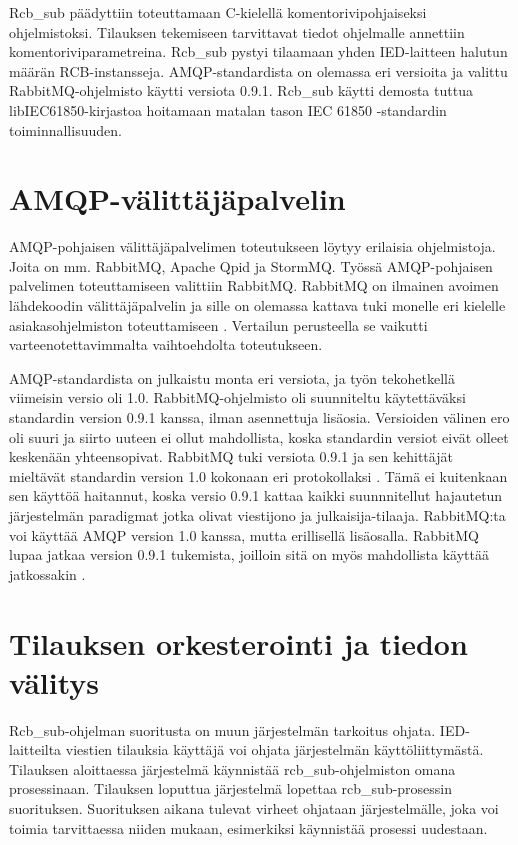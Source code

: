 Rcb\_sub päädyttiin toteuttamaan C-kielellä komentorivipohjaiseksi ohjelmistoksi. Tilauksen tekemiseen tarvittavat tiedot ohjelmalle annettiin komentoriviparametreina. Rcb\_sub pystyi tilaamaan yhden IED-laitteen halutun määrän RCB-instansseja. AMQP-standardista on olemassa eri versioita ja valittu RabbitMQ-ohjelmisto käytti versiota 0.9.1. Rcb\_sub käytti demosta tuttua libIEC61850-kirjastoa hoitamaan matalan tason IEC 61850 -standardin toiminnallisuuden.


\section{AMQP-välittäjäpalvelin}
AMQP-pohjaisen välittäjäpalvelimen toteutukseen löytyy erilaisia ohjelmistoja. Joita on mm. RabbitMQ, Apache Qpid ja StormMQ. Työssä AMQP-pohjaisen palvelimen toteuttamiseen valittiin RabbitMQ. RabbitMQ on ilmainen avoimen lähdekoodin välittäjäpalvelin ja sille on olemassa kattava tuki monelle eri kielelle asiakasohjelmiston toteuttamiseen \cite{rabbitmq-supported-languages}. Vertailun perusteella se vaikutti varteenotettavimmalta vaihtoehdolta toteutukseen.

AMQP-standardista on julkaistu monta eri versiota, ja työn tekohetkellä viimeisin versio oli 1.0. RabbitMQ-ohjelmisto oli suunniteltu käytettäväksi standardin version 0.9.1 kanssa, ilman asennettuja lisäosia. Versioiden välinen ero oli suuri ja siirto uuteen ei ollut mahdollista, koska standardin versiot eivät olleet keskenään yhteensopivat. RabbitMQ tuki versiota 0.9.1 ja sen kehittäjät mieltävät standardin version 1.0 kokonaan eri protokollaksi \cite{RabbitMQ-Compatibility-and-Conformance}. Tämä ei kuitenkaan sen käyttöä haitannut, koska versio 0.9.1 kattaa kaikki suunnnitellut hajautetun järjestelmän paradigmat jotka olivat viestijono ja julkaisija-tilaaja. RabbitMQ:ta voi käyttää AMQP version 1.0 kanssa, mutta erillisellä lisäosalla. RabbitMQ lupaa jatkaa version 0.9.1 tukemista, joilloin sitä on myös mahdollista käyttää jatkossakin \cite{RabbitMQ-Compatibility-and-Conformance}.



\section{Tilauksen orkesterointi ja tiedon välitys}
Rcb\_sub-ohjelman suoritusta on muun järjestelmän tarkoitus ohjata. IED-laitteilta viestien tilauksia käyttäjä voi ohjata järjestelmän käyttöliittymästä. Tilauksen aloittaessa järjestelmä käynnistää rcb\_sub-ohjelmiston omana prosessinaan. Tilauksen loputtua järjestelmä lopettaa rcb\_sub-prosessin suorituksen. Suorituksen aikana tulevat virheet ohjataan järjestelmälle, joka voi toimia tarvittaessa niiden mukaan, esimerkiksi käynnistää prosessi uudestaan.

